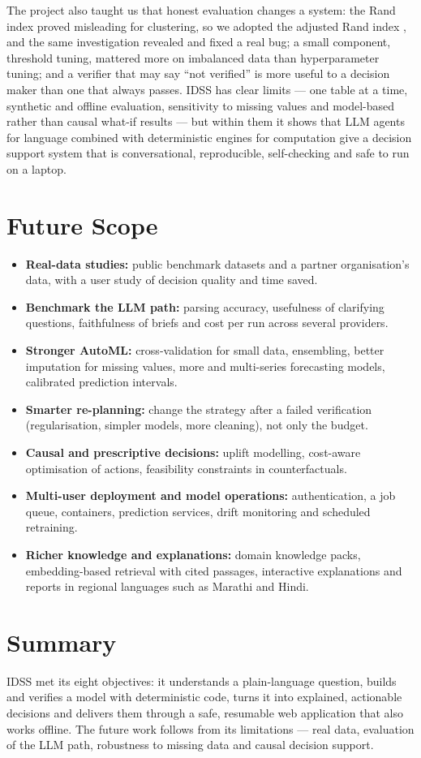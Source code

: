 The project also taught us that honest evaluation changes a system: the Rand index proved misleading for clustering, so we adopted the adjusted Rand index \cite{ref18}, and the same investigation revealed and fixed a real bug; a small component, threshold tuning, mattered more on imbalanced data than hyperparameter tuning; and a verifier that may say ``not verified'' is more useful to a decision maker than one that always passes. IDSS has clear limits --- one table at a time, synthetic and offline evaluation, sensitivity to missing values and model-based rather than causal what-if results --- but within them it shows that LLM agents for language combined with deterministic engines for computation give a decision support system that is conversational, reproducible, self-checking and safe to run on a laptop.

\FloatBarrier
\section{Future Scope}\label{sec:8.2}

\begin{itemize}
  \item \textbf{Real-data studies:} public benchmark datasets and a partner organisation's data, with a user study of decision quality and time saved.
  \item \textbf{Benchmark the LLM path:} parsing accuracy, usefulness of clarifying questions, faithfulness of briefs and cost per run across several providers.
  \item \textbf{Stronger AutoML:} cross-validation for small data, ensembling, better imputation for missing values, more and multi-series forecasting models, calibrated prediction intervals.
  \item \textbf{Smarter re-planning:} change the strategy after a failed verification (regularisation, simpler models, more cleaning), not only the budget.
  \item \textbf{Causal and prescriptive decisions:} uplift modelling, cost-aware optimisation of actions, feasibility constraints in counterfactuals.
  \item \textbf{Multi-user deployment and model operations:} authentication, a job queue, containers, prediction services, drift monitoring and scheduled retraining.
  \item \textbf{Richer knowledge and explanations:} domain knowledge packs, embedding-based retrieval with cited passages, interactive explanations and reports in regional languages such as Marathi and Hindi.
\end{itemize}

\FloatBarrier
\section{Summary}\label{sec:8.3}

IDSS met its eight objectives: it understands a plain-language question, builds and verifies a model with deterministic code, turns it into explained, actionable decisions and delivers them through a safe, resumable web application that also works offline. The future work follows from its limitations --- real data, evaluation of the LLM path, robustness to missing data and causal decision support.
